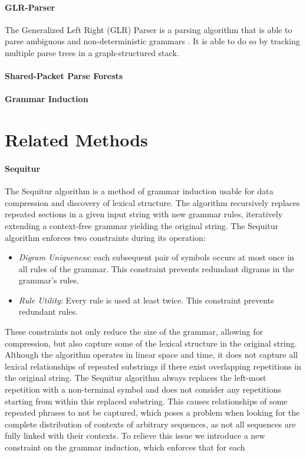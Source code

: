 \paragraph{GLR-Parser}
The Generalized Left Right (GLR) Parser is a parsing algorithm that is able to parse 
ambiguous
and non-deterministic grammars \cite{lang1974deterministic}. It is able to do so by tracking multiple parse trees in a graph-structured stack.

\paragraph{Shared-Packet Parse Forests}

\paragraph{Grammar Induction}

\section{Related Methods}

\paragraph{Sequitur}
The Sequitur algorithm \cite{nevill1997identifying} is a method of grammar induction 
usable for data compression and discovery of lexical structure. The algorithm 
recursively replaces repeated sections in a given input string with new grammar rules, iteratively extending a context-free grammar yielding the original string. The Sequitur algorithm enforces two constraints during its operation:
\begin{itemize}
    \item \textit{Digram Uniqueness}: each subsequent pair of symbols occurs at most once in all rules of the grammar. This constraint prevents redundant digrams in the grammar's rules.
    \item \textit{Rule Utility}: Every rule is used at least twice. This constraint prevents redundant rules.
\end{itemize}
These constraints not only reduce the size of the grammar, allowing for compression, but also capture some of the lexical structure in the original string. Although the algorithm operates in linear space and time, it does not capture all lexical relationships of repeated substrings if there exist overlapping repetitions in the original string. The Sequitur algorithm always replaces the left-most repetition with a non-terminal symbol and does not consider any repetitions starting from within this replaced substring. This causes relationships of some repeated phrases to not be captured, which poses a problem when looking for the complete distribution of contexts of arbitrary sequences, as not all sequences are fully linked with their contexts.
To relieve this issue we introduce a new constraint on the grammar induction, which enforces that for each 
